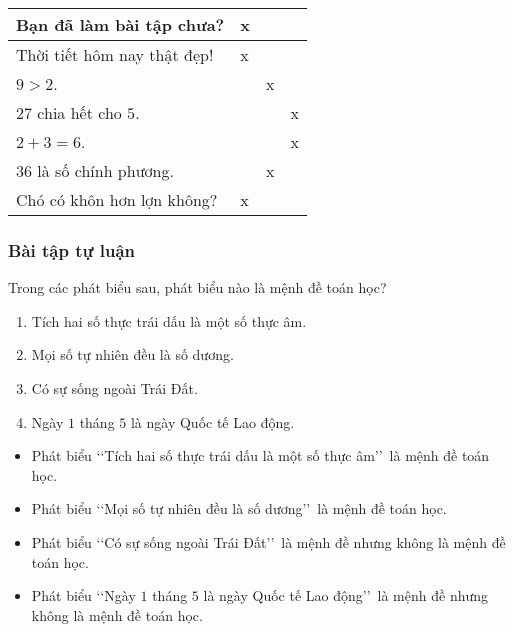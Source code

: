 \begin{vd}
{\begin{center}
\begin{tabular}{|>{\raggedright\arraybackslash}m{5.5cm}|>{\centering\arraybackslash}m{2cm}|>{\centering\arraybackslash}m{2cm}|>{\centering\arraybackslash}m{2cm}|}
				\hline
				Bạn đã làm bài tập chưa? & x &  &  \\
				\hline
				Thời tiết hôm nay thật đẹp! & x &  &  \\
				\hline
				$9>2$. &  & x &  \\
				\hline
				$27$ chia hết cho $5$. &  &  & x \\
				\hline
				$2+3=6$. &  &  & x \\
				\hline
				$36$ là số chính phương. &  & x &  \\
				\hline
				Chó có khôn hơn lợn không? & x &  &  \\
				\hline
			\end{tabular}
		\end{center}
	}
\end{vd}

\subsubsection{Bài tập tự luận}
\begin{bt}%
	Trong các phát biểu sau, phát biểu nào là mệnh đề toán học?
	\begin{enumerate}
		\item Tích hai số thực trái dấu là một số thực âm.
		\item Mọi số tự nhiên đều là số dương.
		\item Có sự sống ngoài Trái Đất.
		\item Ngày $1$ tháng $5$ là ngày Quốc tế Lao động.
	\end{enumerate}
	\loigiai
	{
		\begin{itemize}
			\item Phát biểu \lq\lq  Tích hai số thực trái dấu là một số thực âm\rq\rq\ là mệnh đề toán học.
			\item Phát biểu \lq\lq  Mọi số tự nhiên đều là số dương\rq\rq\ là mệnh đề toán học.
			\item Phát biểu \lq\lq  Có sự sống ngoài Trái Đất\rq\rq\ là mệnh đề nhưng không là mệnh đề toán học.
			\item Phát biểu \lq\lq  Ngày $1$ tháng $5$ là ngày Quốc tế Lao động\rq\rq\ là mệnh đề nhưng không là mệnh đề toán học.
		\end{itemize}
	}
\end{bt}
